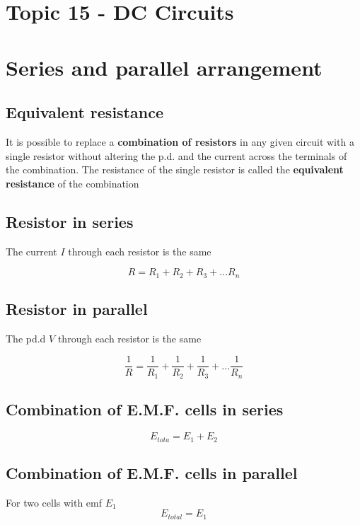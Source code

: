 \documentclass[a4paper, 10pt]{article}
\begin{document}
\section*{Topic 15 - DC Circuits}

\section{Series and parallel arrangement}
\subsection{Equivalent resistance}
\begin{framed}
   It is possible to replace a \textbf{combination of resistors} in any given circuit with a single resistor without altering the p.d. and the current across the terminals of the combination. The resistance of the single resistor is called the \textbf{equivalent resistance} of the combination
\end{framed}	

\subsection{Resistor in series}
The current $I$ through each resistor is the same
\begin{center}
   \begin{framed}
      \[
      R = R_1 + R_2 + R_3 + ... R_n
      \]
      
   \end{framed}	
\end{center}	

\subsection{Resistor in parallel}
The pd.d $V$ through each resistor is the same
\begin{center}
   \begin{framed}
      \[
      \frac{1}{R} = \frac{1}{R_1} + \frac{1}{R_2}+ \frac{1}{R_3 }+ ... \frac{1}{R_n}
      \]
   \end{framed}	
\end{center}	

\subsection{Combination of E.M.F. cells in series}
\[
   E_{tota} = E_1 + E_2
\]

\subsection{Combination of E.M.F. cells in parallel}
For two cells with emf $E_1$ 
\[
   E_{total} = E_1
\]
\end{document}
